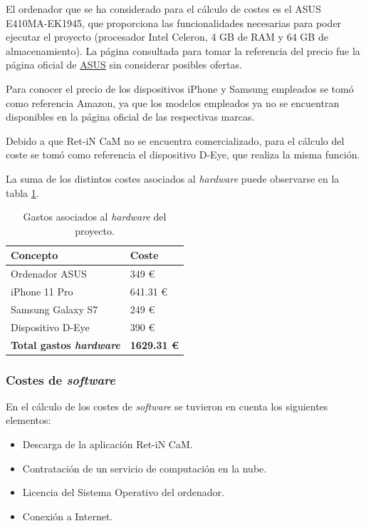 El ordenador que se ha considerado para el cálculo de costes es el ASUS E410MA-EK1945, que proporciona las funcionalidades necesarias para poder ejecutar el proyecto (procesador Intel Celeron, 4 GB de RAM y 64 GB de almacenamiento). La página consultada para tomar la referencia del precio fue la página oficial de \href{https://estore.asus.com/es/90nb0q11-m00we0-portatil-asus-laptop-e410ma-ek1945.html?gclid=CjwKCAjwm4ukBhAuEiwA0zQxk3hTQWGHZ7mFLFAO8mEUZidZAvBljcASkk-kpJjftiZa_7Qp1pCVGRoCSJgQAvD_BwE}{ASUS} sin considerar posibles ofertas.

Para conocer el precio de los dispositivos iPhone y Samsung empleados se tomó como referencia Amazon, ya que los modelos empleados ya no se encuentran disponibles en la página oficial de las respectivas marcas.

Debido a que Ret-iN CaM no se encuentra comercializado, para el cálculo del coste se tomó como referencia el dispositivo D-Eye, que realiza la misma función. 

La suma de los distintos costes asociados al \textit{hardware} puede observarse en la tabla \ref{tab:cost_hard}.

\begin{table}[]
\centering
\begin{tabular}{@{}ll@{}}
\toprule
\rowcolor[HTML]{C0C0C0} 
Concepto                       & Coste     \\ \midrule
Ordenador ASUS                 & 349 €     \\
iPhone 11 Pro                  & 641.31 €  \\
Samsung Galaxy S7              & 249 €     \\
Dispositivo D-Eye              & 390 €     \\ \midrule
\textbf{Total gastos \textit{hardware}} & \textbf{1629.31 €} \\ \bottomrule
\end{tabular}
\caption{Gastos asociados al \textit{hardware} del proyecto.}
\label{tab:cost_hard}
\end{table}

\subsubsection{Costes de \textit{software}}

En el cálculo de los costes de \textit{software} se tuvieron en cuenta los siguientes elementos:
\begin{itemize}
    \item Descarga de la aplicación Ret-iN CaM.
    \item Contratación de un servicio de computación en la nube.
    \item Licencia del Sistema Operativo del ordenador.
    \item Conexión a Internet.
\end{itemize}

